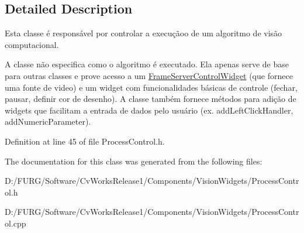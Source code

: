 \subsection{Detailed Description}
Esta classe é responsável por controlar a execuçãoo de um algoritmo de visão computacional. 

A classe não especifica como o algoritmo é executado. Ela apenas serve de base para outras classes e prove acesso a um \hyperlink{class_frame_server_control_widget}{Frame\+Server\+Control\+Widget} (que fornece uma fonte de video) e um widget com funcionalidades básicas de controle (fechar, pausar, definir cor de desenho). A classe também fornece métodos para adição de widgets que facilitam a entrada de dados pelo usuário (ex. add\+Left\+Click\+Handler, add\+Numeric\+Parameter). 

Definition at line 45 of file Process\+Control.\+h.



The documentation for this class was generated from the following files\+:\begin{DoxyCompactItemize}
\item 
D\+:/\+F\+U\+R\+G/\+Software/\+Cv\+Works\+Release1/\+Components/\+Vision\+Widgets/Process\+Control.\+h\item 
D\+:/\+F\+U\+R\+G/\+Software/\+Cv\+Works\+Release1/\+Components/\+Vision\+Widgets/Process\+Control.\+cpp\end{DoxyCompactItemize}
